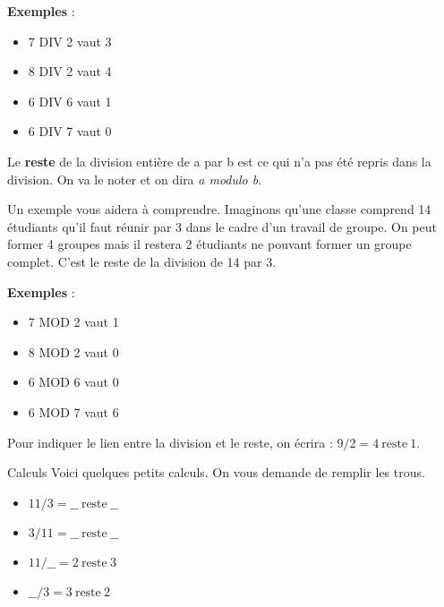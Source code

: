 			\begin{minipage}{2cm}
			\textbf{Exemples} :	
			\\
			\end{minipage}
			\begin{minipage}{9cm}
			\begin{multicols}{2}
			\begin{itemize}
				\item 7 DIV 2 vaut 3
				\item 8 DIV 2 vaut 4
				\item 6 DIV 6 vaut 1
				\item 6 DIV 7 vaut 0
			\end{itemize}
			\end{multicols}
			\end{minipage}
			
			Le \textbf{reste} de la division entière de a par b
			est ce qui n'a pas été repris dans la division.
			On va le noter 
			et on dira \emph{a modulo b}.
	
			Un exemple vous aidera à comprendre.	
			Imaginons qu'une classe comprend 14 étudiants
			qu'il faut réunir par 3
			dans le cadre d'un travail de groupe.
			On peut former 4 groupes 
			mais il restera 2 étudiants ne pouvant former un groupe complet.
			C'est le reste de la division de 14 par 3.
			
			\begin{minipage}{2cm}
			\textbf{Exemples} :	
			\\
			\end{minipage}
			\begin{minipage}{9cm}
			\begin{multicols}{2}
			\begin{itemize}
				\item 7 MOD 2 vaut 1
				\item 8 MOD 2 vaut 0
				\item 6 MOD 6 vaut 0
				\item 6 MOD 7 vaut 6
			\end{itemize}
			\end{multicols}
			\end{minipage}
		
			Pour indiquer le lien entre la division et le reste,
			on écrira : $9/2 = 4\ \textrm{reste}\ 1$.

			\begin{Exercice}{Calculs}
				Voici quelques petits calculs.
				On vous demande de remplir les trous.
				
				\begin{multicols}{2}
					\begin{itemize}
					\item $11/3 = \_\_\ \textrm{reste}\ \_\_$
					\item $3/11 = \_\_\ \textrm{reste}\ \_\_$
					\item $11/\_\_ = 2\ \textrm{reste}\ 3$
					\item $\_\_/3 = 3\ \textrm{reste}\ 2$
					\end{itemize}
				\end{multicols}
			\end{Exercice}

